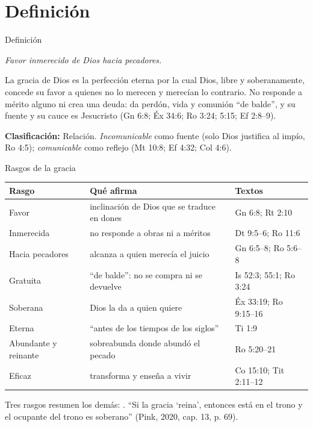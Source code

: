 \section{Definición}

\begin{frame}{Definición}
\begin{tcolorbox}[colback=papiro,colframe=dorado,boxrule=1.2pt,arc=3pt]
\centering\itshape Favor inmerecido de Dios hacia pecadores.
\end{tcolorbox}
\begin{tcolorbox}[colback=papiro,colframe=azul,boxrule=1pt,arc=3pt,fonttitle=\bfseries\small,title=Desarrollada,fontupper=\small]
La gracia de Dios es la perfección eterna por la cual Dios, libre y soberanamente, concede su favor a quienes no lo merecen y merecían lo contrario. No responde a mérito alguno ni crea una deuda: da perdón, vida y comunión ``de balde'', y su fuente y su cauce es Jesucristo (Gn 6:8; Éx 34:6; Ro 3:24; 5:15; Ef 2:8--9).
\end{tcolorbox}
\scriptsize\textbf{Clasificación:} Relación. \emph{Incomunicable} como fuente (solo Dios justifica al impío, Ro 4:5); \emph{comunicable} como reflejo (Mt 10:8; Ef 4:32; Col 4:6).\par
{}
\end{frame}

\begin{frame}{Rasgos de la gracia}
\scriptsize\renewcommand{\arraystretch}{1.15}
\begin{tabular}{@{}>{\RaggedRight\arraybackslash}p{2.6cm}>{\RaggedRight\arraybackslash}p{5.8cm}>{\RaggedRight\arraybackslash}p{3.2cm}@{}}
\toprule
\textbf{Rasgo} & \textbf{Qué afirma} & \textbf{Textos} \\ \midrule
Favor & inclinación de Dios que se traduce en dones & Gn 6:8; Rt 2:10 \\
Inmerecida & no responde a obras ni a méritos & Dt 9:5--6; Ro 11:6 \\
Hacia pecadores & alcanza a quien merecía el juicio & Gn 6:5--8; Ro 5:6--8 \\
Gratuita & ``de balde'': no se compra ni se devuelve & Is 52:3; 55:1; Ro 3:24 \\
Soberana & Dios la da a quien quiere & Éx 33:19; Ro 9:15--16 \\
Eterna & ``antes de los tiempos de los siglos'' & 2 Ti 1:9 \\
Abundante y reinante & sobreabunda donde abundó el pecado & Ro 5:20--21 \\
Eficaz & transforma y enseña a vivir & 1 Co 15:10; Tit 2:11--12 \\
\bottomrule
\end{tabular}\par\medskip
\small Tres rasgos resumen los demás: . ``Si la gracia `reina', entonces está en el trono y el ocupante del trono es soberano'' (Pink, 2020, cap. 13, p. 69).
\end{frame}

